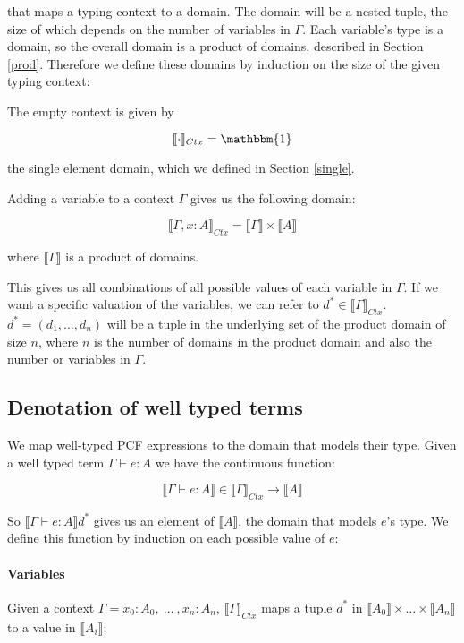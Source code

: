 that maps a typing context to a domain. The domain will be a nested tuple, the size of which depends on the number of variables in $\Gamma$. Each variable's type is a domain, so the overall domain is a product of domains, described in Section \ref{prod}.  Therefore we define these domains by induction on the size of the given typing context:

The empty context is given by 

\[\llbracket \cdot \rrbracket_{Ctx} = \mathbbm{1}\]

the single element domain, which we defined in Section \ref{single}. 

Adding a variable to a context $\Gamma$ gives us the following domain:

\[ \llbracket \Gamma, x : A \rrbracket_{Ctx} = \llbracket \Gamma \rrbracket \times \llbracket A \rrbracket \]

where $\llbracket \Gamma \rrbracket$ is a product of domains.

This gives us all combinations of all possible values of each variable in $\Gamma$. If we want a specific valuation of the variables, we can refer to $d^* \in \llbracket \Gamma \rrbracket_{Ctx}$. $d^* = (d_1, \dots, d_n)$ will be a tuple in the underlying set of the product domain of size $n$, where $n$ is the number of domains in the product domain and also the number or variables in $\Gamma$.

\subsection{Denotation of well typed terms}
We map well-typed PCF expressions to the domain that models their type. Given a well typed term $\Gamma \vdash e : A$ we have the continuous function:

\[ \llbracket \Gamma \vdash e : A \rrbracket \in \llbracket \Gamma \rrbracket_{Ctx} \to \llbracket A \rrbracket \]

So $\llbracket \Gamma \vdash e : A \rrbracket d^*$ gives us an element of $\llbracket A \rrbracket$, the domain that models $e$'s type. We define this function by induction on each possible value of $e$:

\paragraph{Variables} 

Given a context $\Gamma = x_0 : A_0, \ \dots \ ,x_n : A_n$, $\llbracket \Gamma \rrbracket_{Ctx}$ maps a tuple $d^*$ in $\llbracket A_0 \rrbracket \times \dots \times \llbracket A_n \rrbracket$ to a value in $\llbracket A_i \rrbracket$:

